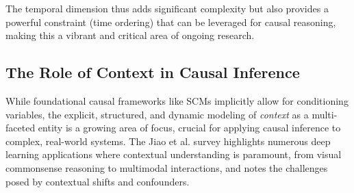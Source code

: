 {{The temporal dimension thus adds significant complexity but also provides a powerful constraint (time ordering) that can be leveraged for causal reasoning, making this a vibrant and critical area of ongoing research.


\subsection{The Role of Context in Causal Inference}
\label{subsec:context_temporality_causality}

While foundational causal frameworks like SCMs implicitly allow for conditioning variables, the explicit, structured, and dynamic modeling of \textit{context} as a multi-faceted entity is a growing area of focus, crucial for applying causal inference to complex, real-world systems. The Jiao et al. survey \cite{jiao2024causal} highlights numerous deep learning applications where contextual understanding is paramount, from visual commonsense reasoning to multimodal interactions, and notes the challenges posed by contextual shifts and confounders.

}}
